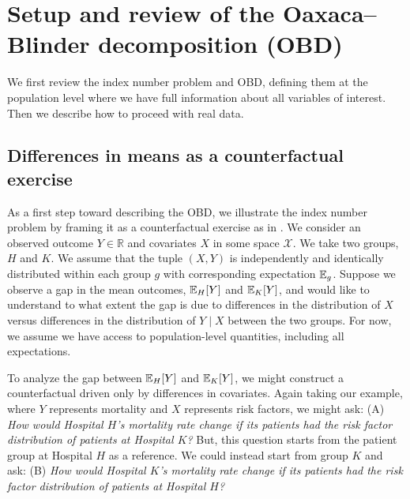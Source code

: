 \section{Setup and review of the Oaxaca--Blinder decomposition (OBD)}
\label{sec:counterfactual_OBD}

We first review the index number problem and OBD, defining them at the population level where we have full information about all variables of interest.
Then we describe how to proceed with real data.


\subsection{Differences in means as a counterfactual exercise} 
\label{sec:counterfactual_example}

As a first step toward describing the OBD, we illustrate the index number problem by framing it as a counterfactual exercise as in \citet{fortinLemieuxFirpo2011}.
We consider an observed outcome $Y \in \mathbb{R}$ and covariates $X$ in some space $\mathcal{X}$. We take two groups, $H$ and $K$. We assume that the tuple $(X,Y)$ is independently and identically distributed within each group $g$ with corresponding expectation $\mathbb{E}_g$. Suppose we observe a gap in the mean outcomes, $\mathbb{E}_H[Y]$ and $\mathbb{E}_K[Y]$, and would like to understand to what extent the gap is due to differences in the distribution of $X$ versus differences in the distribution of $Y\mid X$ between the two groups. 
For now, we assume we have access to population-level quantities, including all expectations.

To analyze the gap between $\mathbb{E}_H[Y]$ and $\mathbb{E}_K[Y]$, we might construct a counterfactual driven only by differences in covariates.
Again taking our example, where $Y$ represents mortality and $X$ represents risk factors, we might ask:
(A) \emph{How would Hospital $H$'s mortality rate change if its patients had the risk factor distribution of patients at Hospital $K$?}
But, this question starts from the patient group at Hospital $H$ as a reference. We could instead start from group $K$ and ask:
(B) \emph{How would Hospital $K$'s mortality rate change if its patients had the risk factor distribution of patients at Hospital $H$?}

